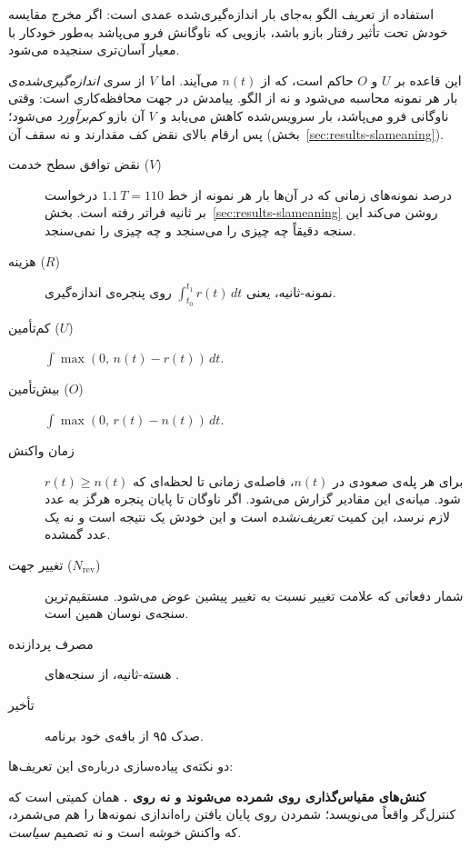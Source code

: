 استفاده از تعریف الگو به‌جای بار اندازه‌گیری‌شده عمدی است: اگر مخرج مقایسه خودش تحت تأثیر
رفتار بازو باشد، بازویی که ناوگانش فرو می‌پاشد به‌طور خودکار با معیار آسان‌تری سنجیده می‌شود.

این قاعده بر $U$ و $O$ حاکم است، که از $n(t)$ می‌آیند. اما $V$ از سری
\emph{اندازه‌گیری‌شده}‌ی بار هر نمونه محاسبه می‌شود و نه از الگو. پیامدش در جهت
محافظه‌کاری است: وقتی ناوگانی فرو می‌پاشد، بار سرویس‌شده کاهش می‌یابد و $V$ آن بازو
\emph{کم‌برآورد} می‌شود؛ پس ارقام بالای نقض کف مقدارند و نه سقف آن
(بخش~\ref{sec:results-slameaning}).

\begin{description}
  \item[نقض توافق سطح خدمت ($V$)] درصد نمونه‌های زمانی که در آن‌ها بار هر نمونه از خط
  $1.1\,T = 110$ درخواست بر ثانیه فراتر رفته است. بخش~\ref{sec:results-slameaning} روشن
  می‌کند این سنجه دقیقاً چه چیزی را می‌سنجد و چه چیزی را نمی‌سنجد.

  \item[هزینه ($R$)] نمونه-ثانیه، یعنی $\int_{t_0}^{t_1} r(t)\,dt$ روی پنجره‌ی اندازه‌گیری.

  \item[کم‌تأمین ($U$)] $\int \max(0,\, n(t) - r(t))\,dt$.

  \item[بیش‌تأمین ($O$)] $\int \max(0,\, r(t) - n(t))\,dt$.

  \item[زمان واکنش] برای هر پله‌ی صعودی در $n(t)$، فاصله‌ی زمانی تا لحظه‌ای که
  $r(t) \ge n(t)$ شود. میانه‌ی این مقادیر گزارش می‌شود. اگر ناوگان تا پایان پنجره هرگز به
  عدد لازم نرسد، این کمیت \emph{تعریف‌نشده} است \mdash{} و این خودش یک نتیجه است و نه یک عدد گمشده.

  \item[تغییر جهت ($N_{\mathrm{rev}}$)] شمار دفعاتی که علامت تغییر  نسبت به
  تغییر پیشین عوض می‌شود. مستقیم‌ترین سنجه‌ی نوسان همین است.

  \item[مصرف پردازنده] هسته-ثانیه، از سنجه‌های .

  \item[تأخیر] صدک ۹۵ از بافه‌ی  خود برنامه.
\end{description}

دو نکته‌ی پیاده‌سازی درباره‌ی این تعریف‌ها:

\textbf{کنش‌های مقیاس‌گذاری روی  شمرده می‌شوند و نه روی
.}  همان کمیتی است که کنترل‌گر واقعاً می‌نویسد؛ شمردن روی
 پایان یافتن راه‌اندازی نمونه‌ها را هم می‌شمرد، که واکنش \emph{خوشه} است و نه تصمیم
\emph{سیاست}.

